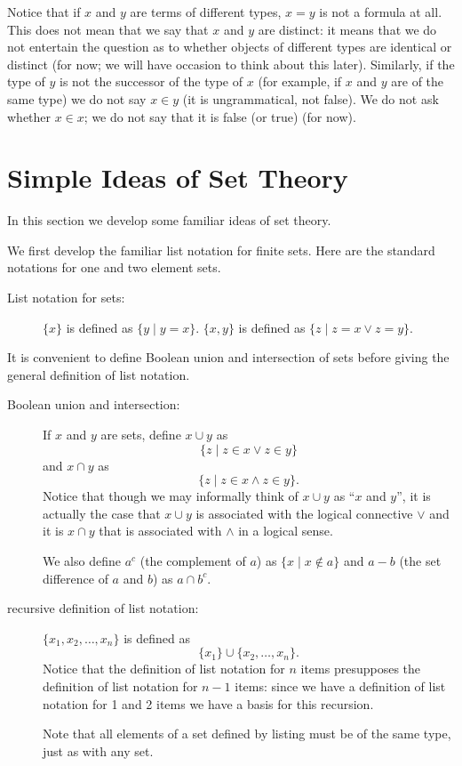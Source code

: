 \documentclass[12pt]{book}
\begin{document}
Notice that if $x$ and $y$ are terms of different types, $x=y$ is not
a formula at all.  This does not mean that we say that $x$ and $y$
are distinct: it means that we do not entertain the question as to
whether objects of different types are identical or distinct (for now;
we will have occasion to think about this later).  Similarly, if the
type of $y$ is not the successor of the type of $x$ (for example, if
$x$ and $y$ are of the same type) we do not say $x \in y$ (it is
ungrammatical, not false).  We do not ask whether $x \in x$; we do not
say that it is false (or true) (for now).

\newpage

\section{Simple Ideas of Set Theory}

In this section we develop some familiar ideas of set theory.

We first develop the familiar list notation for finite sets.  Here are
the standard notations for one and two element sets.

\begin{description}

\item[List notation for sets:]  $\{x\}$ is defined as $\{y \mid y=x\}$.
$\{x,y\}$ is defined as $\{z \mid z=x\vee z=y\}$.

\end{description}

It is convenient to define Boolean union and intersection of sets
before giving the general definition of list notation.

\begin{description}

\item[Boolean union and intersection:] If $x$ and $y$ are sets, define
$x \cup y$ as $$\{z \mid z \in x \vee z \in y\}$$ and $x \cap y$ as $$\{z
\mid z \in x \wedge z \in y\}.$$  Notice that though we may informally
think of $x \cup y$ as ``$x$ and $y$'', it is actually the case that
$x \cup y$ is associated with the logical connective $\vee$ and it is
$x \cap y$ that is associated with $\wedge$ in a logical sense.

We also define $a^c$ (the complement of $a$) as $\{x \mid x \not\in
a\}$ and $a-b$ (the set difference of $a$ and $b$) as $a \cap b^c$.

\item[recursive definition of list notation:] $\{x_1,x_2,\ldots,x_n\}$
is defined as $$\{x_1\} \cup \{x_2,\ldots,x_n\}.$$  Notice that the
definition of list notation for $n$ items presupposes the definition
of list notation for $n-1$ items: since we have a definition of list
notation for 1 and 2 items we have a basis for this recursion.

Note that all elements of a set defined by listing must be of the same
type, just as with any set.

\end{description}
\end{document}
